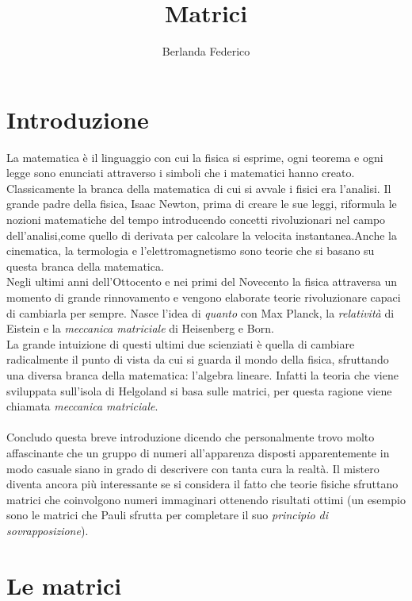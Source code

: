 \documentclass[a4paper]{article}
\title{Matrici}
\author{Berlanda Federico}
\begin{document}
\maketitle

\section{Introduzione}

La matematica è il linguaggio con cui la fisica si esprime, ogni teorema e ogni legge sono enunciati attraverso i simboli che i matematici hanno creato.
\\Classicamente la branca della matematica di cui si avvale i fisici era l’analisi. Il grande padre della fisica, Isaac Newton, prima di creare le sue leggi, riformula le nozioni matematiche del tempo introducendo concetti rivoluzionari nel campo dell’analisi,come quello di derivata per calcolare la velocita instantanea.Anche la cinematica, la termologia e l’elettromagnetismo sono teorie che si basano su questa branca della matematica.
\\Negli ultimi anni dell’Ottocento e nei primi del Novecento la fisica attraversa un momento di grande rinnovamento e vengono elaborate teorie rivoluzionare capaci di cambiarla per sempre. Nasce l’idea di \textit{quanto} con Max Planck, la \textit{relatività} di Eistein e la \textit{meccanica matriciale} di Heisenberg e Born.
\\La grande intuizione di questi ultimi due scienziati è quella di cambiare radicalmente il punto di vista da cui si guarda il mondo della fisica, sfruttando una diversa branca della matematica: l'algebra lineare. Infatti la teoria che viene sviluppata sull’isola di Helgoland si basa sulle matrici, per questa ragione viene chiamata \textit{meccanica matriciale}.
\\
\\Concludo questa breve introduzione dicendo che personalmente trovo molto affascinante che un gruppo di numeri all'apparenza disposti apparentemente in modo casuale siano in grado di descrivere con tanta cura la realtà. Il mistero diventa ancora più interessante se si considera il fatto che teorie fisiche sfruttano matrici che coinvolgono numeri immaginari ottenendo risultati ottimi (un esempio sono le matrici che Pauli sfrutta per completare il suo \textit{principio di sovrapposizione}).

\section{Le matrici}
\end{document}
